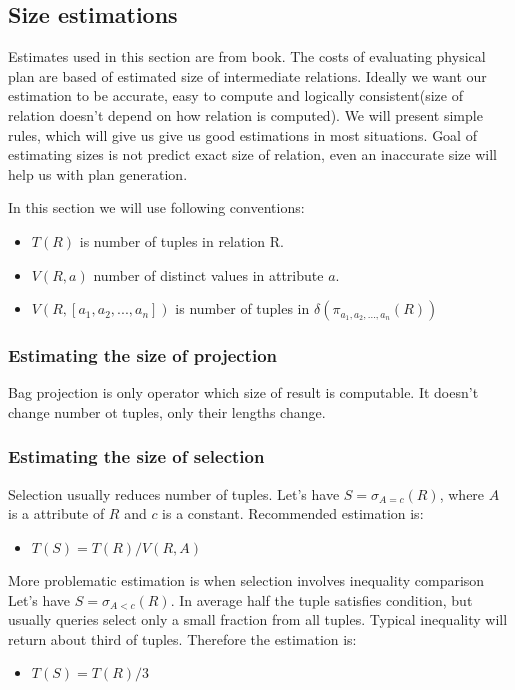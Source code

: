 \subsection{Size estimations}
Estimates used in this section are from book\cite{database}. 
The costs of evaluating physical plan are based of estimated size of interme\-dia\-te relations. Ideally we want our estimation to be accurate, easy to compute and logically consistent(size of relation doesn't depend on how relation is computed). We will present simple rules, which will give us give us good estimations in most situations. Goal of estimating sizes is not predict exact size of relation, even an inaccurate size will help us with plan generation.

In this section we will use following conventions:

\begin{itemize}
\item $T(R)$ is number of tuples in relation R.
\item $V(R,a)$ number of distinct values in attribute $a$. 
\item $V(R,[a_1,a_2,...,a_n])$ is number of tuples in $\delta(\pi_{a_1,a_2,...,a_n}(R))$
\end{itemize}

\subsubsection{Estimating the size of projection}

Bag projection is only operator which size of result is computable. It doesn't change number ot tuples, only their lengths change.

\subsubsection{Estimating the size of selection}

Selection usually reduces number of tuples. Let's have $S=\sigma_{A=c}(R)$, where $A$ is a attribute of $R$ and $c$ is a constant. Recommended estimation is:
\begin{itemize}
\item $T(S)=T(R)/V(R,A)$
\end{itemize}

More problematic estimation is when selection involves inequality comparison Let's have $S=\sigma_{A<c}(R)$. In average half the tuple satisfies condition, but usually queries select only a small fraction from all tuples. Typical inequality will return about third of tuples. Therefore the estimation is:
\begin{itemize}
\item $T(S)=T(R)/3$
\end{itemize}


